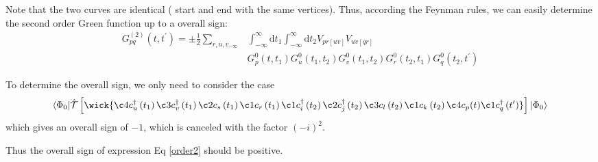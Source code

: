 Note that the two curves are identical ( start and end with the same vertices).
Thus, according the Feynman rules, we can easily determine the second order Green function up to a overall sign:
\begin{equation} \label{order2}
	\begin{aligned} 
	G_{p q}^{(2)}\left(t, t^{\prime}\right)=\pm \frac{1}{2} \sum_{r, u, v_{-\infty}} & \int_{-\infty}^{\infty} \mathrm{d} t_{1} \int_{-\infty}^{\infty} \mathrm{d} t_{2} V_{p r[u v]} V_{u v[q r]} 
	\\ 
	& G_{p}^{0}\left(t, t_{1}\right) G_{u}^{0}\left(t_{1}, t_{2}\right) G_{v}^{0}\left(t_{1}, t_{2}\right) G_{r}^{0}\left(t_{2}, t_{1}\right) G_{q}^{0}\left(t_{2}, t^{\prime}\right) 
	\end{aligned}
\end{equation}

To determine the overall sign, we only need to consider the case
\begin{equation}
	\langle\Phi_{0}|
	\hat{\mathcal{T}}\left[
		\wick{\c4 c_{u}^{\dagger}\left(t_{1}\right) \c3 c_{v}^{\dagger}\left(t_{1}\right) \c2 c_{s}\left(t_{1}\right) \c1 c_{r}\left(t_{1}\right) \c1 c_{i}^{\dagger}\left(t_{2}\right) \c2 c_{j}^{\dagger}\left(t_{2}\right) \c3 c_{l}\left(t_{2}\right) \c1 c_{k}\left(t_{2}\right) \c4 c_{p}(t) \c1 c_{q}^{\dagger}\left(t^{\prime}\right)}
		\right]
		| \Phi_{0}\rangle
\end{equation}
which gives an overall sign of $-1$, which is canceled with the factor $(-i)^2$.

Thus the overall sign of expression Eq \ref{order2} should be positive.

